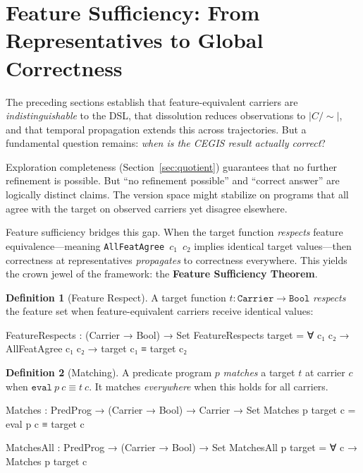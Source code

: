 \documentclass[9pt,a4paper]{article}
\theoremstyle{plain}
\theoremstyle{definition}
\newtheorem{definition}{Definition}
\theoremstyle{remark}
\begin{document}

\section{Feature Sufficiency: From Representatives to Global Correctness}
\label{sec:sufficiency}

The preceding sections establish that feature-equivalent carriers are \emph{indistinguishable} to the DSL, that dissolution reduces observations to $|C/{\sim}|$, and that temporal propagation extends this across trajectories.  But a fundamental question remains: \emph{when is the CEGIS result actually correct}?

Exploration completeness (Section~\ref{sec:quotient}) guarantees that no further refinement is possible.  But ``no refinement possible'' and ``correct answer'' are logically distinct claims.  The version space might stabilize on programs that all agree with the target on observed carriers yet disagree elsewhere.

Feature sufficiency bridges this gap.  When the target function \emph{respects} feature equivalence---meaning \texttt{AllFeatAgree}~$c_1$~$c_2$ implies identical target values---then correctness at representatives \emph{propagates} to correctness everywhere.  This yields the crown jewel of the framework: the \textbf{Feature Sufficiency Theorem}.

\begin{definition}[Feature Respect]
A target function $t : \texttt{Carrier} \to \texttt{Bool}$ \emph{respects} the feature set when feature-equivalent carriers receive identical values:
\end{definition}

\begin{spec}
    FeatureRespects : (Carrier → Bool) → Set
    FeatureRespects target = ∀ c₁ c₂ →
      AllFeatAgree c₁ c₂ → target c₁ ≡ target c₂
\end{spec}

\begin{definition}[Matching]
A predicate program $p$ \emph{matches} a target $t$ at carrier $c$ when $\texttt{eval}~p~c \equiv t~c$.  It matches \emph{everywhere} when this holds for all carriers.
\end{definition}

\begin{spec}
    Matches    : PredProg → (Carrier → Bool) → Carrier → Set
    Matches    p target c = eval p c ≡ target c

    MatchesAll : PredProg → (Carrier → Bool) → Set
    MatchesAll p target = ∀ c → Matches p target c
\end{spec}
\end{document}
